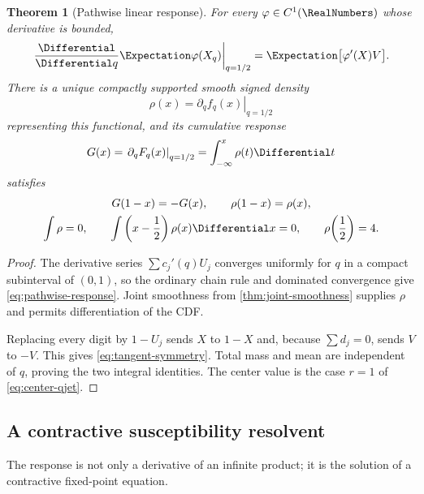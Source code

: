 \documentclass[11pt,oneside]{article}
\newtheorem{theorem}{Theorem}[section]
\theoremstyle{definition}
\theoremstyle{remark}
\begin{document}
\begin{theorem}[Pathwise linear response]
\label{thm:pathwise-response}
For every \(\varphi\in C^1(\RealNumbers)\) whose derivative is bounded,
\begin{equation}
 \left.\frac{\Differential}{\Differential q}\Expectation\varphi(X_q)\right|_{q=1/2}
 =\Expectation\bigl[\varphi'(X)V\bigr].
 \label{eq:pathwise-response}
\end{equation}
There is a unique compactly supported smooth signed density
\begin{equation}
 \rho(x)=\left.\partial_q f_q(x)\right|_{q=1/2}
 \label{eq:rho-def}
\end{equation}
representing this functional, and its cumulative response
\begin{equation}
 G(x)=\left.\partial_qF_q(x)\right|_{q=1/2}
      =\int_{-\infty}^{x}\rho(t)\Differential t
 \label{eq:G-def}
\end{equation}
satisfies
\begin{gather}
 G(1-x)=-G(x),\qquad \rho(1-x)=\rho(x),
 \label{eq:tangent-symmetry}\\
 \int\rho=0,
 \qquad \int\left(x-\frac12\right)\rho(x)\Differential x=0,
 \qquad \rho\!\left(\frac12\right)=4.
 \label{eq:tangent-normalizations}
\end{gather}
\end{theorem}

\begin{proof}
The derivative series \(\sum c_j'(q)U_j\) converges uniformly for \(q\) in a compact
subinterval of \((0,1)\), so the ordinary chain rule and dominated convergence give
\eqref{eq:pathwise-response}.  Joint smoothness from \cref{thm:joint-smoothness} supplies
\(\rho\) and permits differentiation of the CDF.

Replacing every digit by \(1-U_j\) sends \(X\) to \(1-X\) and, because \(\sum d_j=0\), sends
\(V\) to \(-V\).  This gives \eqref{eq:tangent-symmetry}.  Total mass and mean are independent
of \(q\), proving the two integral identities.  The center value is the case \(r=1\) of
\eqref{eq:center-qjet}.
\end{proof}

\subsection{A contractive susceptibility resolvent}

The response is not only a derivative of an infinite product; it is the solution of a
contractive fixed-point equation.
\end{document}

